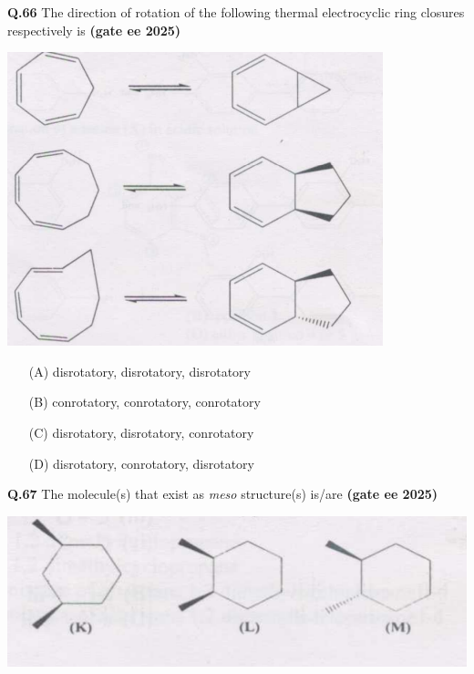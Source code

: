 \documentclass[journal,12pt,onecolumn]{exam}
\theoremstyle{remark}
\begin{document}
\noindent\textbf{Q.66} The direction of rotation of the following thermal electrocyclic ring closures respectively is \hfill{\textbf{(gate ee 2025)}}

\includegraphics[scale=1.5]{images/image8.png}


\begin{multicols}{2}
\begin{itemize}
    \item[(A)] disrotatory, disrotatory, disrotatory
    \item[(B)] conrotatory, conrotatory, conrotatory
    \item[(C)] disrotatory, disrotatory, conrotatory
    \item[(D)] disrotatory, conrotatory, disrotatory
\end{itemize}
\end{multicols}

\vspace{0.5cm}


\noindent\textbf{Q.67} The molecule(s) that exist as \textit{meso} structure(s) is/are \hfill{\textbf{(gate ee 2025)}}

\includegraphics[scale=1]{images/image9.png}

\vspace{0.3cm}
\end{document}
